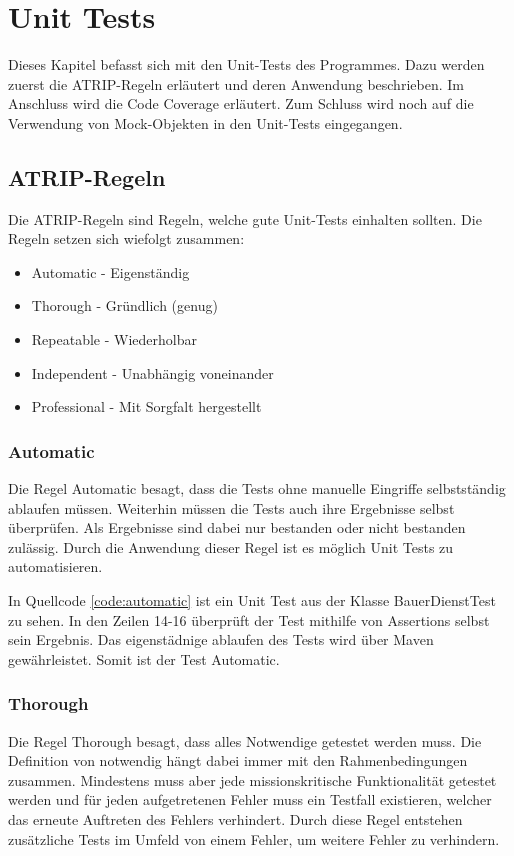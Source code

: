 \chapter{Unit Tests}
Dieses Kapitel befasst sich mit den Unit-Tests des Programmes. Dazu werden zuerst die ATRIP-Regeln erläutert und deren Anwendung beschrieben. Im Anschluss wird die Code Coverage erläutert. Zum Schluss wird noch auf die Verwendung von Mock-Objekten in den Unit-Tests eingegangen.

\section{ATRIP-Regeln}
Die ATRIP-Regeln sind Regeln, welche gute Unit-Tests einhalten sollten.
Die Regeln setzen sich wiefolgt zusammen:
\begin{itemize}
	\item Automatic - Eigenständig
	\item Thorough - Gründlich (genug)
	\item Repeatable - Wiederholbar
	\item Independent - Unabhängig voneinander
	\item Professional - Mit Sorgfalt hergestellt
\end{itemize}

\subsection{Automatic}
Die Regel \glqq{}Automatic\grqq{} besagt, dass die Tests ohne manuelle Eingriffe selbstständig ablaufen müssen. Weiterhin müssen die Tests auch ihre Ergebnisse selbst überprüfen. Als Ergebnisse sind dabei nur \glqq{}bestanden\grqq{} oder \glqq{}nicht bestanden\grqq{} zulässig. Durch die Anwendung dieser Regel ist es möglich Unit Tests zu automatisieren. \pagebreak



In Quellcode \ref{code:automatic} ist ein Unit Test aus der Klasse BauerDienstTest zu sehen. In den Zeilen 14-16 überprüft der Test mithilfe von Assertions selbst sein Ergebnis. Das eigenstädnige ablaufen des Tests wird über Maven gewährleistet. Somit ist der Test Automatic.

\subsection{Thorough}
Die Regel \glqq{}Thorough\grqq{} besagt, dass alles Notwendige getestet werden muss. Die Definition von notwendig hängt dabei immer mit den Rahmenbedingungen zusammen. Mindestens muss aber jede missionskritische Funktionalität getestet werden und für jeden aufgetretenen Fehler muss ein Testfall existieren, welcher das erneute Auftreten des Fehlers verhindert. Durch diese Regel entstehen zusätzliche Tests im Umfeld von einem Fehler, um weitere Fehler zu verhindern.


